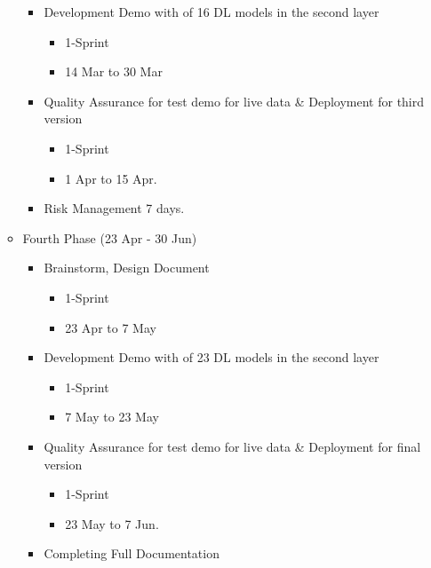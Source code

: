 \begin{itemize}
\begin{itemize}
\begin{itemize}
                    \item Development Demo with of 16 DL models in the second layer
                       \begin{itemize}
                          \item 1-Sprint
                          \item 14 Mar to 30 Mar
                      \end{itemize}
                    \item Quality Assurance for test demo for live data \& Deployment for third version
                       \begin{itemize}
                          \item 1-Sprint
                          \item 1 Apr to 15 Apr.
                       \end{itemize}
                    \item Risk Management 7 days.
                \end{itemize}
            \item Fourth Phase (23 Apr - 30 Jun)
               \begin{itemize}
                   \item Brainstorm, Design Document
                      \begin{itemize}
                          \item 1-Sprint
                        \item 23 Apr to 7 May
                      \end{itemize}
                    \item Development Demo with of 23 DL models in the second layer
                       \begin{itemize}
                          \item 1-Sprint
                          \item 7 May to 23 May
                      \end{itemize}
                    \item Quality Assurance for test demo for live data \& Deployment for  final version
                       \begin{itemize}
                          \item 1-Sprint
                          \item 23 May to 7 Jun.
                       \end{itemize}
                    \item Completing Full Documentation

\end{itemize}
\end{itemize}
\end{itemize}
